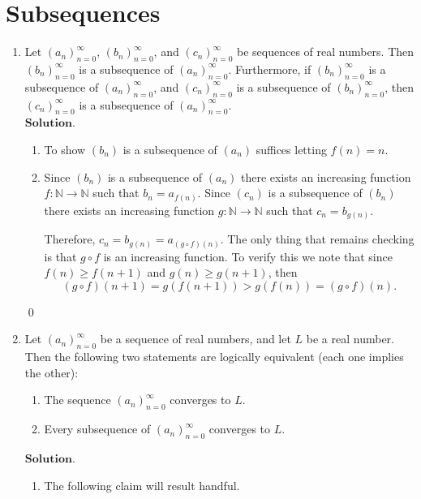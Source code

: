 \documentclass{article}
\theoremstyle{remark}
\begin{document}
\section*{Subsequences}
\begin{enumerate}
    \item Let $(a_n)_{n=0}^\infty$, $(b_n)_{n=0}^\infty$, and $(c_n)_{n=0}^\infty$ be sequences of real numbers. Then $(b_n)_{n=0}^\infty$ is a subsequence of $(a_n)_{n=0}^\infty$. 
    Furthermore, if $(b_n)_{n=0}^\infty$ is a subsequence of $(a_n)_{n=0}^\infty$, and $(c_n)_{n=0}^\infty$ is a subsequence of $(b_n)_{n=0}^\infty$, 
    then $(c_n)_{n=0}^\infty$ is a subsequence of $(a_n)_{n=0}^\infty$.
    \\$\textbf{Solution.}$
    \begin{enumerate}
        \item To show $(b_n)$ is a subsequence of $(a_n)$ suffices letting $f(n) = n$.

        \item Since $(b_n)$ is a subsequence of $(a_n)$ there exists an increasing function $f: \mathbb{N}\to\mathbb{N}$ such that 
        $b_n = a_{f(n)}$. Since $(c_n)$ is a subsequence of $(b_n)$ there exists an increasing function $g: \mathbb{N}\to \mathbb{N}$ such that 
        $c_n = b_{g(n)}$.
        
        Therefore, $c_n = b_{g(n)} = a_{(g\circ f)(n)}$.
        The only thing that remains checking is that $g\circ f$ is an increasing function. 
        To verify this we note that since $f(n) \geq f(n+1)$ and $g(n) \geq g(n+1)$, then 
        \[
        (g\circ f)(n+1) = g(f(n+1)) > g(f(n)) = (g\circ f)(n).
        \]
    \end{enumerate}
    \begin{flushright}
        \qed
    \end{flushright}

    \item Let $(a_n)_{n=0}^\infty$ be a sequence of real numbers, and let $L$ be a real number. Then the following two statements are logically equivalent (each one implies the other):

    \begin{enumerate}
        \item[(a)] The sequence $(a_n)_{n=0}^\infty$ converges to $L$.
        \item[(b)] Every subsequence of $(a_n)_{n=0}^\infty$ converges to $L$.
    \end{enumerate}
    $\textbf{Solution.}$
    \begin{enumerate}
        \item[(a) $\implies$ (b)]
        The following claim will result handful.


\end{enumerate}
\end{enumerate}
\end{document}
